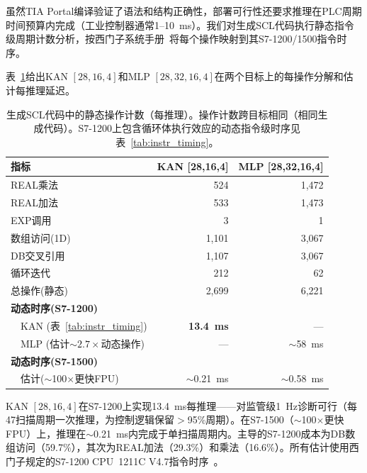 \documentclass[journal,onecolumn]{IEEEtran}
\theoremstyle{definition}
\theoremstyle{plain}
\theoremstyle{remark}
\begin{document}
虽然TIA Portal编译验证了语法和结构正确性，部署可行性还要求推理在PLC周期时间预算内完成（工业控制器通常1--10~ms）。我们对生成SCL代码执行静态指令级周期计数分析，按西门子系统手册~\cite{siemens_s7_1200_2022}将每个操作映射到其S7-1200/1500指令时序。

表~\ref{tab:cycle_count}给出KAN $[28,16,4]$和MLP $[28,32,16,4]$在两个目标上的每操作分解和估计每推理延迟。

\begin{table}[!t]
\centering
\caption{生成SCL代码中的静态操作计数（每推理）。操作计数跨目标相同（相同生成代码）。S7-1200上包含循环体执行效应的动态指令级时序见表~\ref{tab:instr_timing}。}
\label{tab:cycle_count}
\footnotesize
\begin{tabular}{lrr}
\toprule
\textbf{指标} & \textbf{KAN [28,16,4]} & \textbf{MLP [28,32,16,4]} \\
\midrule
REAL乘法      & 524  & 1,472 \\
REAL加法      & 533  & 1,473 \\
EXP调用       & 3    & 1 \\
数组访问(1D)  & 1,101 & 3,067 \\
DB交叉引用    & 1,107 & 3,067 \\
循环迭代      & 212  & 62 \\
\midrule
总操作(静态)  & 2,699 & 6,221 \\
\midrule
\textbf{动态时序(S7-1200)} & & \\
~~KAN (表~\ref{tab:instr_timing}) & \textbf{13.4~ms} & --- \\
~~MLP (估计$\sim 2.7\times$动态操作) & --- & $\sim$58~ms \\
\textbf{动态时序(S7-1500)} & & \\
~~估计($\sim$100$\times$更快FPU) & $\sim$0.21~ms & $\sim$0.58~ms \\
\bottomrule
\end{tabular}
\end{table}

KAN $[28,16,4]$在S7-1200上实现13.4~ms每推理——对监管级1~Hz诊断可行（每47扫描周期一次推理，为控制逻辑保留$>$95\%周期）。在S7-1500（$\sim$100$\times$更快FPU）上，推理在$\sim$0.21~ms内完成于单扫描周期内。主导的S7-1200成本为DB数组访问（59.7\%），其次为REAL加法（29.3\%）和乘法（16.6\%）。所有估计使用西门子规定的S7-1200 CPU~1211C V4.7指令时序~\cite{siemens_s7_1200_2022}。
\end{document}
